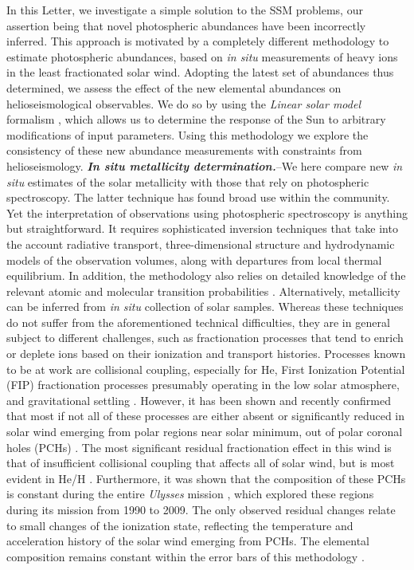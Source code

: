 \documentclass[aps,prl,twocolumn,showpacs]{revtex4}
\begin{document}
%
In this Letter, we investigate a simple solution to the SSM problems, our assertion being that novel photospheric abundances have been incorrectly inferred. This approach is motivated by a completely different methodology to estimate photospheric abundances, based on \textit{in situ} measurements of heavy ions in the least fractionated solar wind. Adopting the latest set of abundances thus determined, we assess the effect of the new elemental abundances on helioseismological observables. We do so by using the \textit{Linear solar model} formalism \cite{villante5}, which allows us to determine the response of the Sun to arbitrary modifications of input parameters. Using this methodology we explore the consistency of these new abundance measurements with constraints from helioseismology. \newline \indent
%
\textbf{\textit{In situ metallicity determination.\/}}\---We here compare new \textit{in situ} estimates of the solar metallicity with those that rely on photospheric spectroscopy. The latter technique has found broad use within the community.  Yet the interpretation of observations using photospheric spectroscopy is anything but straightforward.  It requires sophisticated inversion techniques that take into the account radiative transport, three-dimensional structure and hydrodynamic models of the observation volumes, along with departures from local thermal equilibrium. In addition, the methodology also relies on detailed knowledge of the relevant atomic and molecular transition probabilities \cite{agss09,caffau}. \newline \indent
%
Alternatively, metallicity can be inferred from \textit{in situ} collection of solar samples. Whereas these techniques do not suffer from the aforementioned technical difficulties, they are in general subject to different challenges, such as fractionation processes that tend to enrich or deplete ions based on their ionization and transport histories. Processes known to be at work are collisional coupling, especially for He, First Ionization Potential (FIP) fractionation processes presumably operating in the low solar atmosphere, and gravitational settling \cite{geiss,gravitational}. \newline \indent
%
However, it has been shown and recently confirmed that most if not all of these processes are either absent or significantly reduced in solar wind emerging from polar regions near solar minimum, out of polar coronal holes (PCHs) \cite{z6,z12}. The most significant residual fractionation effect in this wind is that of insufficient collisional coupling that affects all of solar wind, but is most evident in He/H \cite{geiss}. Furthermore, it was shown that the composition of these PCHs is constant during the entire \textit{Ulysses} mission \cite{ulysses}, which explored these regions during its mission from 1990 to 2009. The only observed residual changes relate to small changes of the ionization state, reflecting the temperature and acceleration history of the solar wind emerging from PCHs. The elemental composition remains constant within the error bars of this methodology \cite{mc,z11}. \newline \indent
\end{document}
